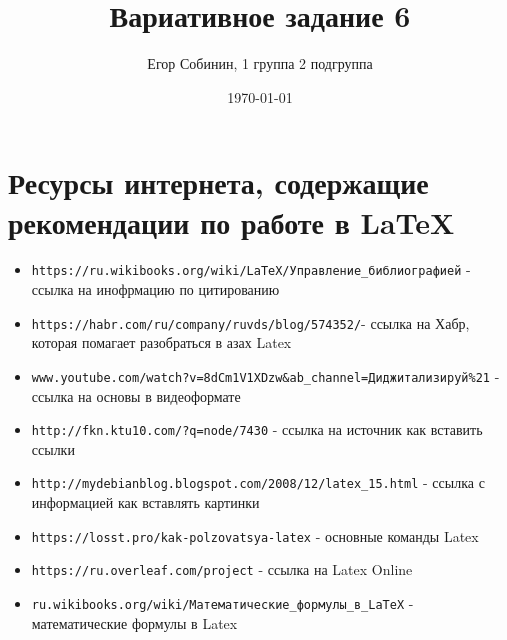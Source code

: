 \documentclass[a4paper,12pt]{article} %
\author{Егор Собинин, 1 группа 2 подгруппа}
\title{Вариативное задание 6}
\date{\today}
\begin{document}
\maketitle

\section{Ресурсы интернета, содержащие рекомендации по работе в LaTeX}
\begin{itemize}
    \item 
    \verb*|https://ru.wikibooks.org/wiki/LaTeX/Управление_библиографией| - ссылка на инофрмацию по цитированию
    \item 
    \verb*|https://habr.com/ru/company/ruvds/blog/574352/|- ссылка на Хабр, которая помагает разобраться в азах Latex
    \item
    \verb*|www.youtube.com/watch?v=8dCm1V1XDzw&ab_channel=Диджитализируй%21| - ссылка на основы в видеоформате
    \item 
    \verb*|http://fkn.ktu10.com/?q=node/7430| - ссылка на источник как вставить ссылки
        \item 
        \verb|http://mydebianblog.blogspot.com/2008/12/latex_15.html| - ссылка с информацией как вставлять картинки
        \item
        \verb |https://losst.pro/kak-polzovatsya-latex| - основные команды Latex
        \item
        \verb |https://ru.overleaf.com/project| - ссылка на Latex Online
        \item
        \verb|ru.wikibooks.org/wiki/Математические_формулы_в_LaTeX| - математические формулы в Latex
    
\end{itemize}
\end{document}
